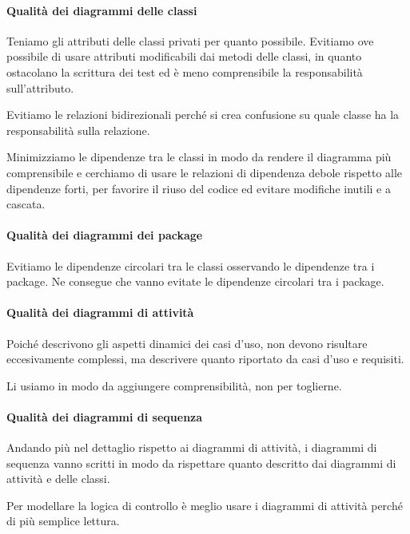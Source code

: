 		\paragraph{Qualità dei diagrammi delle classi}
		Teniamo gli attributi delle classi privati per quanto possibile.
        Evitiamo ove possibile di usare attributi modificabili dai metodi delle classi, in quanto ostacolano la scrittura dei test ed è meno comprensibile la responsabilità sull'attributo.\par
        Evitiamo le relazioni bidirezionali perché si crea confusione su quale classe ha la responsabilità sulla relazione.\par
        Minimizziamo le dipendenze tra le classi in modo da rendere il diagramma più comprensibile e cerchiamo di usare le relazioni di dipendenza debole rispetto alle dipendenze forti, per favorire il riuso del codice ed evitare modifiche inutili e a cascata.

        \paragraph{Qualità dei diagrammi dei package}
        Evitiamo le dipendenze circolari tra le classi osservando le dipendenze tra i package. Ne consegue che vanno evitate le dipendenze circolari tra i package.

		\paragraph{Qualità dei diagrammi di attività}
		Poiché descrivono gli aspetti dinamici dei casi d'uso, non devono risultare eccesivamente complessi, ma descrivere quanto riportato da casi d'uso e requisiti.\par
        Li usiamo in modo da aggiungere comprensibilità, non per toglierne.

		\paragraph{Qualità dei diagrammi di sequenza}
		Andando più nel dettaglio rispetto ai diagrammi di attività, i diagrammi di sequenza vanno scritti in modo da rispettare quanto descritto dai diagrammi di attività e delle classi.\par
        Per modellare la logica di controllo è meglio usare i diagrammi di attività perché di più semplice lettura.


